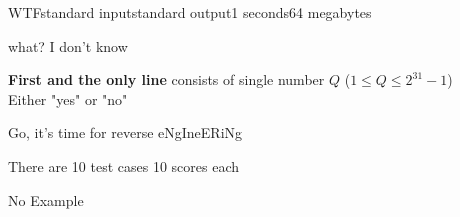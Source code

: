 \documentclass[11pt,a4paper]{article}
\begin{document}
\begin{problem}{WTF}{standard input}{standard output}{1 seconds}{64 megabytes}

what? I don't know

\InputFile

\textbf{First and the only line} consists of single number $Q$ ($1 \le Q \le 2^{31}-1$) \\ 

\OutputFile
Either "yes" or "no"

Go, it's time for reverse eNgIneERiNg

\Scoring
There are 10 test cases 10 scores each

\Examples

No Example

\end{problem}
\end{document}
